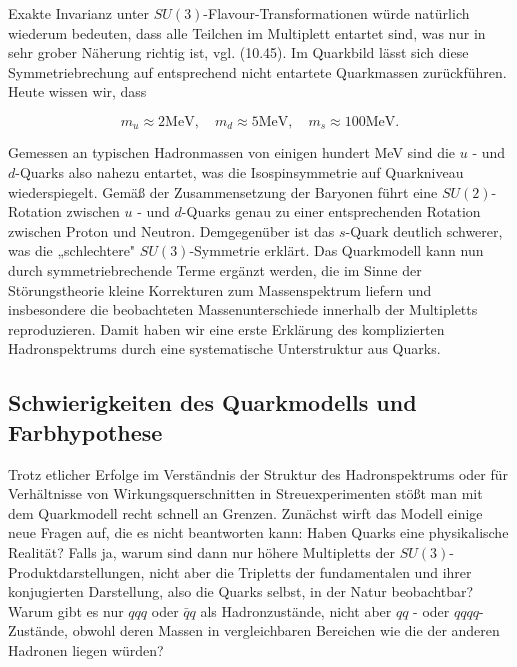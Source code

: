 \documentclass[10pt, letterpaper]{article}
\begin{document}
Exakte Invarianz unter $S U(3)$-Flavour-Transformationen würde natürlich wiederum bedeuten, dass alle Teilchen im Multiplett entartet sind, was nur in sehr grober Näherung richtig ist, vgl. (10.45). Im Quarkbild lässt sich diese Symmetriebrechung auf entsprechend nicht entartete Quarkmassen zurückführen. Heute wissen wir, dass

$$
m_{u} \approx 2 \mathrm{MeV}, \quad m_{d} \approx 5 \mathrm{MeV}, \quad m_{s} \approx 100 \mathrm{MeV} .
$$

Gemessen an typischen Hadronmassen von einigen hundert MeV sind die $u$ - und $d$-Quarks also nahezu entartet, was die Isospinsymmetrie auf Quarkniveau wiederspiegelt. Gemäß der Zusammensetzung der Baryonen führt eine $S U(2)$-Rotation zwischen $u$ - und $d$-Quarks genau zu einer entsprechenden Rotation zwischen Proton und Neutron. Demgegenüber ist das $s$-Quark deutlich schwerer, was die „schlechtere" $S U(3)$-Symmetrie erklärt. Das Quarkmodell kann nun durch symmetriebrechende Terme ergänzt werden, die im Sinne der Störungstheorie kleine Korrekturen zum Massenspektrum liefern und insbesondere die beobachteten Massenunterschiede innerhalb der Multipletts reproduzieren. Damit haben wir eine erste Erklärung des komplizierten Hadronspektrums durch eine systematische Unterstruktur aus Quarks.

\subsection*{Schwierigkeiten des Quarkmodells und Farbhypothese}
Trotz etlicher Erfolge im Verständnis der Struktur des Hadronspektrums oder für Verhältnisse von Wirkungsquerschnitten in Streuexperimenten stößt man mit dem Quarkmodell recht schnell an Grenzen. Zunächst wirft das Modell einige neue Fragen auf, die es nicht beantworten kann: Haben Quarks eine physikalische Realität? Falls ja, warum sind dann nur höhere Multipletts der $S U(3)$-Produktdarstellungen, nicht aber die Tripletts der fundamentalen und ihrer konjugierten Darstellung, also die Quarks selbst, in der Natur beobachtbar? Warum gibt es nur $q q q$ oder $\bar{q} q$ als Hadronzustände, nicht aber $q q$ - oder $q q q q$-Zustände, obwohl deren Massen in vergleichbaren Bereichen wie die der anderen Hadronen liegen würden?
\end{document}
